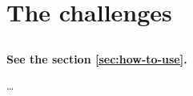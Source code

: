 \part{The challenges}
\chapter{}
\label{sec:Introduction}

\textbf{See the section \ref{sec:how-to-use}.}

\dots
\Blindtext
